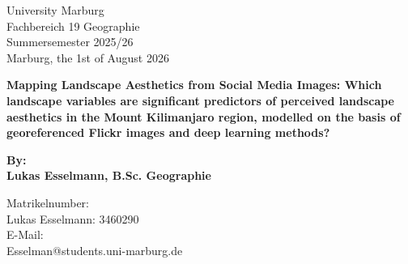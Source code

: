 \begin{titlepage}
    \begin{minipage}[t]{0.4\textwidth}
        \raggedright
        
        \large
        University Marburg\\
        Fachbereich 19 Geographie\\
        Summersemester 2025/26\\
        Marburg, the 1st of August 2026\\
    
    \end{minipage}
    \hfill
    \begin{minipage}[t]{0.6\textwidth}
        \raggedleft
    
        \large
        
        
    \end{minipage}
    \begin{center}

        \vspace*{5cm}

        \huge
        
        \textbf{Mapping Landscape Aesthetics from Social Media Images: Which landscape variables are significant predictors of perceived landscape aesthetics in the Mount Kilimanjaro region, modelled on the basis of georeferenced Flickr images and deep learning methods?
}
        \vspace{1cm}
        
        \Large
        
        \textbf{By:\\Lukas Esselmann, B.Sc. Geographie}
        
        \vspace{2.5cm}
        
    \end{center}
    \begin{minipage}[t]{0.7\textwidth}
    
        \vspace{2cm}
        
        \large
        
        Matrikelnumber:\\Lukas Esselmann: 3460290
        \vspace{0.3cm}
        \\E-Mail:\\Esselman@students.uni-marburg.de\\
        
        \vspace{0.3cm}
        
        
        
    \end{minipage}
    
\end{titlepage}